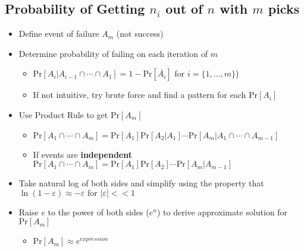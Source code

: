 \documentclass{article}\usepackage{amsmath,amssymb,amsthm,tikz,tkz-graph,color,chngpage,soul,hyperref,csquotes,graphicx,floatrow, listings}\newcommand*{\QEDB}{\hfill\ensuremath{\square}}\newtheorem*{prop}{Proposition}\renewcommand{\theenumi}{\alph{enumi}}\usepackage[shortlabels]{enumitem}\usepackage[nobreak=true]{mdframed}\usetikzlibrary{matrix,calc}\MakeOuterQuote{"}\usepackage[margin=0.75in]{geometry} \newtheorem{theorem}{Theorem}\newcommand{\Z}{\mathbb Z}\newcommand{\R}{\mathbb R}\newcommand{\Q}{\mathbb Q}\newcommand{\N}{\mathbb N}\newcommand{\x}[1]{\textrm{ #1 }}\newcommand{\pr}{\textrm{Pr}}
\begin{document}
\subsection*{Probability of Getting $n_i$ out of $n$ with $m$ picks}
\begin{itemize}
\item Define event of failure $A_m$ (not success)
\item Determine probability of failing on each iteration of $m$
    \begin{itemize}
    \item $\pr[A_i|A_{i-1}\cap\cdots\cap A_1]= 1-\pr[\bar{A_i}]$ for $i=\{1,...,m\}$)
    \item If not intuitive, try brute force and find a pattern for each $\pr[A_i]$
    \end{itemize}
\item Use Product Rule to get $\pr[A_m]$
    \begin{itemize}
    \item $\pr[A_1\cap\cdots\cap A_m]=\pr[A_1]\pr[A_2|A_1]\cdots\pr[A_m|A_1\cap\cdots\cap A_{m-1}]$
    \item If events are \textbf{independent} $\pr[A_1\cap\cdots\cap A_m]=\pr[A_1]\pr[A_2]\cdots\pr[A_m|A_{m-1}]$
    \end{itemize}
\item Take natural log of both sides and simplify using the property that $\ln(1-\varepsilon)\approx-\varepsilon \x{for} |\varepsilon| <<1$
\item Raise $e$ to the power of both sides ($e^n$) to derive approximate solution for $\pr[A_m]$
    \begin{itemize}
    \item $\pr[A_m]\approx e^{expression}$
    \end{itemize}
\end{itemize}
\end{document}
